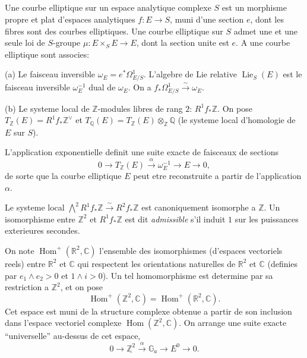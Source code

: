\documentclass[11pt,reqno]{amsart}
\theoremstyle{plain}
\theoremstyle{remark}
\DeclareMathOperator{\Hom}{Hom}
\DeclareMathOperator{\Lie}{Lie}
\newcommand{\Z}{\mathbb{Z}}
\newcommand{\Q}{\mathbb{Q}}
\newcommand{\R}{\mathbb{R}}
\newcommand{\C}{\mathbb{C}}
\newcommand{\Ga}{\mathbb{G}_a}
\newcommand{\isom}{\xrightarrow{\sim}}
\numberwithin{equation}{section}
\begin{document}
\subsection{}\label{subsec:2.1}

Une courbe elliptique sur un espace analytique complexe $S$ est un morphisme propre et plat d'espaces analytiques $f: E \to S$, muni d'une section $e$, dont les fibres sont des courbes elliptiques. Une courbe elliptique sur $S$ admet une et une seule loi de $S$-groupe $\mu: E \times_S E \to E$, dont la section unite est $e$. A une courbe elliptique sont associes:

(a) Le faisceau inversible $\omega_E = e^*\Omega^1_{E/S}$. L'algebre de Lie relative $\Lie_S(E)$ est le faisceau inversible $\omega_E^{-1}$ dual de $\omega_E$. On a $f_*\Omega^1_{E/S} \isom \omega_E$.

(b) Le systeme local de $\Z$-modules libres de rang $2$: $R^1f_*\Z$. On pose $T_\Z(E) = R^1f_*\Z^\vee$ et $T_\Q(E) = T_\Z(E) \otimes_\Z \Q$ (le systeme local d'homologie de $E$ sur $S$).

L'application exponentielle definit une suite exacte de faisceaux de sections
\begin{equation}\label{eq:alpha}
0 \to T_\Z(E) \xrightarrow{\alpha} \omega_E^{-1} \to E \to 0,
\end{equation}
de sorte que la courbe elliptique $E$ peut etre reconstruite a partir de l'application $\alpha$.

Le systeme local $\bigwedge^2 R^1f_*\Z \isom R^2f_*\Z$ est canoniquement isomorphe a $\Z$. Un isomorphisme entre $\Z^2$ et $R^1f_*\Z$ est dit \emph{admissible} s'il induit $1$ sur les puissances exterieures secondes.

On note $\Hom^+(\R^2, \C)$ l'ensemble des isomorphismes (d'espaces vectoriels reels) entre $\R^2$ et $\C$ qui respectent les orientations naturelles de $\R^2$ et $\C$ (definies par $e_1 \wedge e_2 > 0$ et $1 \wedge i > 0$). Un tel homomorphisme est determine par sa restriction a $\Z^2$, et on pose
\[
\Hom^+(\Z^2, \C) = \Hom^+(\R^2, \C).
\]
Cet espace est muni de la structure complexe obtenue a partir de son inclusion dans l'espace vectoriel complexe $\Hom(\Z^2, \C)$. On arrange une suite exacte ``universelle'' au-dessus de cet espace,
\[
0 \to \underline{\Z^2} \xrightarrow{\alpha} \Ga \to E^0 \to 0.
\]
\end{document}
